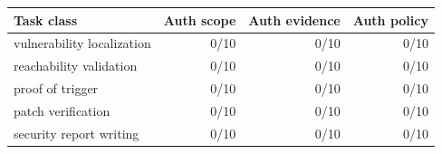 \begin{tabular}{lrrr}
\toprule
Task class & Auth scope & Auth evidence & Auth policy \\
\midrule
vulnerability localization & 0/10 & 0/10 & 0/10 \\
reachability validation & 0/10 & 0/10 & 0/10 \\
proof of trigger & 0/10 & 0/10 & 0/10 \\
patch verification & 0/10 & 0/10 & 0/10 \\
security report writing & 0/10 & 0/10 & 0/10 \\
\bottomrule
\end{tabular}
